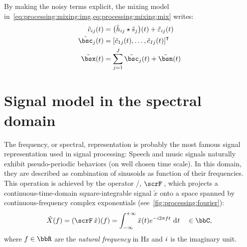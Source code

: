 \mynewline
By making the noisy terms explicit, the mixing model in~\cref{eq:processing:mixing:img,eq:processing:mixing:mix} writes:
\begin{align}
    \tilde{\img}_{\idxMicSrc}(t) &=  \kparen{\tilde{\rir}_{\idxMicSrc} \convCont \tilde{\src}_\idxSrc} (t) +  \tilde{\varepsilon}_{\idxMicSrc}(t)\\
    \tilde{\imgs}_\idxSrc(t)         &= \ktranspose{\klist{\tilde{\img}_{1\idxSrc}(t), \dots, \tilde{\img}_{\numMics\idxSrc}(t)}} \nonumber\\
    \tilde{\mics}(t)                 &= \sum_{\idxSrc=1}^{\numSrcs} \tilde{\imgs}_\idxSrc(t) + \tilde{\bsn}( t)
\end{align}

\section{Signal model in the spectral domain}\label{sec:processing:domains}%
The frequency, or spectral, representation is probably the most famous signal representation used in signal processing:
Speech and music signals naturally exhibit pseudo-periodic behaviors (on well chosen time scale).
In this domain, they are described as combination of sinusoids as function of their frequencies.
\\This operation is achieved by the operator \FTdef/, $\fourierTrans{}$, which projects a continuous-time-domain square-integrable signal $\tilde{x}$ onto a space spanned by continuous-frequency complex exponentials (see~\cref{fig:processing:fourier}):
\begin{equation}\label{eq:processing:ft}
    \tilde{X}(f) = (\fourierTrans{\tilde{x}})(f) =
        \int_{-\infty}^{+\infty}
        \tilde{x}(t)
        \cste^{-\csti 2 \pi f t}
        \,\kdiff{t} \quad \in \bbC
    ,
\end{equation}
where $f \in \bbR$ are the \textit{natural frequency} in $\si{\Hz}$ and ${i}$ is the imaginary unit.
